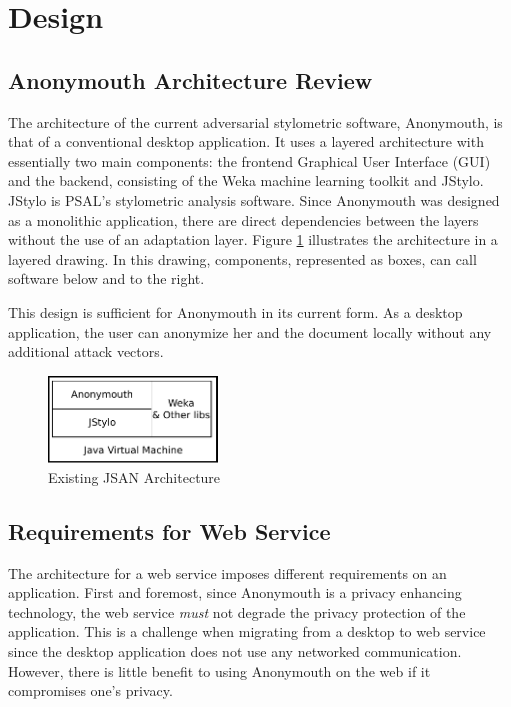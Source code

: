 \documentclass[letterpaper]{article}
\begin{document}
\section{Design}\label{sec:design}

\subsection{Anonymouth Architecture Review}

The architecture of the current adversarial stylometric software,
Anonymouth, is that of a conventional desktop application.  It uses a
layered architecture with essentially two main components: the
frontend Graphical User Interface (GUI) and the backend, consisting of
the Weka machine learning toolkit and JStylo.  JStylo is PSAL's
stylometric analysis software.  Since Anonymouth was designed as a
monolithic application, there are direct dependencies between the
layers without the use of an adaptation layer.  Figure \ref{fig:jsan}
illustrates the architecture in a layered drawing.  In this drawing,
components, represented as boxes, can call software below and to the
right.

This design is sufficient for Anonymouth in its current form.  As a
desktop application, the user can anonymize her and the document
locally without any additional attack vectors.

\begin{figure}
  \centering
    \includegraphics[width=0.4\textwidth]{img/jsan.pdf}
  \caption{Existing JSAN Architecture}
  \label{fig:jsan}
\end{figure}

\subsection{Requirements for Web Service}\label{sec:reqs}

The architecture for a web service imposes different requirements on
an application.  First and foremost, since Anonymouth is a privacy
enhancing technology, the web service \emph{must} not degrade the
privacy protection of the application.  This is a challenge when
migrating from a desktop to web service since the desktop application
does not use any networked communication.  However, there is little
benefit to using Anonymouth on the web if it compromises one's
privacy.
\end{document}
